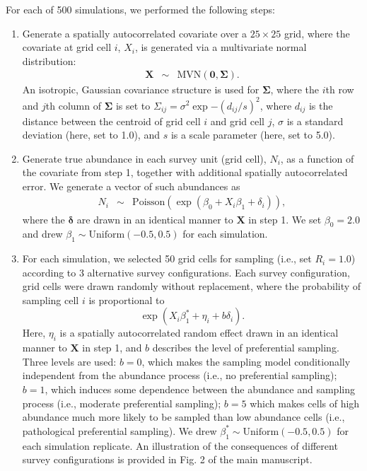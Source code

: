 \documentclass[times,mee,doublespace,]{besauth2}
\begin{document}
\begin{flushleft}
For each of 500 simulations, we performed the following steps:

\begin{enumerate}
  \item Generate a spatially autocorrelated covariate over a $25 \times 25$ grid, where the covariate at grid cell $i$, $X_i$, is generated via a multivariate normal distribution:
      \begin{eqnarray}
        \textbf{X} & \sim & \textrm{MVN} (\textbf{0},\boldsymbol{\Sigma}).
        \label{eq:cov}
      \end{eqnarray}
      An isotropic, Gaussian covariance structure is used for $\boldsymbol{\Sigma}$, where the $i$th row and $j$th column of $\boldsymbol{\Sigma}$ is set to $\Sigma_{ij}=\sigma^2 \exp{-(d_{ij}/s)^2}$, where $d_{ij}$ is the distance between the centroid of grid cell $i$ and grid cell $j$, $\sigma$ is a standard deviation (here, set to 1.0), and $s$ is a scale parameter (here, set to 5.0).
  \item Generate true abundance in each survey unit (grid cell), $N_i$, as a function of the covariate from step 1, together with additional spatially autocorrelated error.  We generate a vector of such abundances as
      \begin{eqnarray}
        N_i & \sim & \textrm{Poisson}(\exp(\beta_0 + X_i \beta_1 + \delta_i)),
      \end{eqnarray}
      where the $\boldsymbol{\delta}$ are drawn in an identical manner to $\textbf{X}$ in step 1.  We set $\beta_0 = 2.0$ and drew $\beta_1 \sim \textrm{Uniform}(-0.5,0.5)$ for each simulation.
  \item For each simulation, we selected 50 grid cells for sampling (i.e., set $R_i = 1.0$) according to 3 alternative survey configurations.  Each survey configuration, grid cells were drawn randomly without replacement, where the probability of sampling cell $i$ is proportional to
      \begin{equation*}
        \exp(X_i \beta_1^*  + \eta_i + b \delta_i).
      \end{equation*}
      Here, $\eta_i$ is a spatially autocorrelated random effect drawn in an identical manner to $\textbf{X}$ in step 1, and $b$ describes the level of preferential sampling.  Three levels are used: $b=0$, which makes the sampling model conditionally independent from the abundance process (i.e., no preferential sampling); $b=1$, which induces some dependence between the abundance and sampling process (i.e., moderate preferential sampling); $b=5$ which makes cells of high abundance much more likely to be sampled than low abundance cells (i.e., pathological preferential sampling).   We drew $\beta_1^* \sim \textrm{Uniform}(-0.5,0.5)$ for each simulation replicate.  An illustration of the consequences of different survey configurations is provided in Fig. 2 of the main manuscript.

\end{enumerate}
\end{flushleft}
\end{document}
